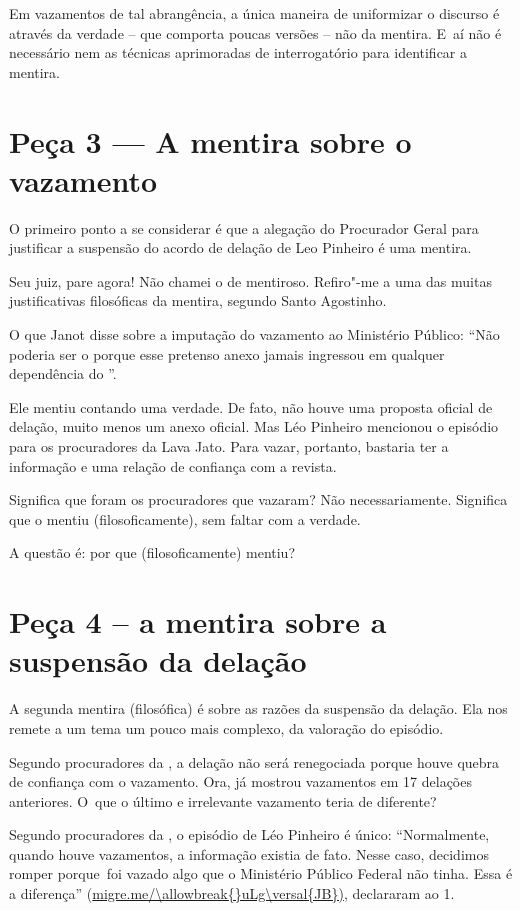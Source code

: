 Em vazamentos de tal abrangência, a única maneira de uniformizar o
discurso é através da verdade -- que comporta poucas versões -- não da
mentira. E~aí não é necessário nem as técnicas aprimoradas de
interrogatório para identificar a mentira.

\section{Peça 3 --- A mentira sobre o vazamento}

O primeiro ponto a se considerar é que a alegação do Procurador Geral
para justificar a suspensão do acordo de delação de Leo Pinheiro é uma
mentira.

Seu juiz, pare agora! Não chamei o  de mentiroso. Refiro"-me a uma das
muitas justificativas filosóficas da mentira, segundo Santo Agostinho.

O que Janot disse sobre a imputação do vazamento ao Ministério Público:
``Não poderia ser o  porque esse pretenso anexo jamais ingressou em
qualquer dependência do ''.

Ele mentiu contando uma verdade. De fato, não houve uma proposta oficial
de delação, muito menos um anexo oficial. Mas Léo Pinheiro mencionou o
episódio para os procuradores da Lava Jato. Para vazar, portanto,
bastaria ter a informação e uma relação de confiança com a revista.

Significa que foram os procuradores que vazaram? Não necessariamente.
Significa que o  mentiu (filosoficamente), sem faltar com a verdade.

A questão é: por que (filosoficamente) mentiu?

\section{Peça 4 -- a mentira sobre a suspensão da delação}

A segunda mentira (filosófica) é sobre as razões da suspensão da
delação. Ela nos remete a um tema um pouco mais complexo, da valoração
do episódio.

Segundo procuradores da , a delação não será renegociada porque houve
quebra de confiança com o vazamento. Ora,  já mostrou vazamentos em
17 delações anteriores. O~que o último e irrelevante vazamento teria de
diferente?

Segundo procuradores da , o episódio de Léo Pinheiro é único:
``Normalmente, quando houve vazamentos, a informação existia de fato.
Nesse caso, decidimos romper porque~foi vazado algo que o Ministério
Público Federal não tinha. Essa é a diferença''
(\url{migre.me/\allowbreak{}uLg\versal{JB})}, declararam ao 1.

